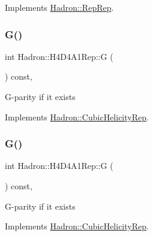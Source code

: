 Implements \mbox{\hyperlink{structHadron_1_1RepRep_a92c8802e5ed7afd7da43ccfd5b7cd92b}{Hadron\+::\+Rep\+Rep}}.

\mbox{\label{structHadron_1_1H4D4A1Rep_adfb4cdaba264ee24b4ab253ef4ca631c}} 
\subsubsection{\texorpdfstring{G()}{G()}\hspace{0.1cm}{\footnotesize\ttfamily [1/3]}}
{\footnotesize\ttfamily int Hadron\+::\+H4\+D4\+A1\+Rep\+::G (\begin{DoxyParamCaption}{ }\end{DoxyParamCaption}) const\hspace{0.3cm}{\ttfamily [inline]}, {\ttfamily [virtual]}}

G-\/parity if it exists 

Implements \mbox{\hyperlink{structHadron_1_1CubicHelicityRep_a50689f42be1e6170aa8cf6ad0597018b}{Hadron\+::\+Cubic\+Helicity\+Rep}}.

\mbox{\label{structHadron_1_1H4D4A1Rep_adfb4cdaba264ee24b4ab253ef4ca631c}} 
\subsubsection{\texorpdfstring{G()}{G()}\hspace{0.1cm}{\footnotesize\ttfamily [2/3]}}
{\footnotesize\ttfamily int Hadron\+::\+H4\+D4\+A1\+Rep\+::G (\begin{DoxyParamCaption}{ }\end{DoxyParamCaption}) const\hspace{0.3cm}{\ttfamily [inline]}, {\ttfamily [virtual]}}

G-\/parity if it exists 

Implements \mbox{\hyperlink{structHadron_1_1CubicHelicityRep_a50689f42be1e6170aa8cf6ad0597018b}{Hadron\+::\+Cubic\+Helicity\+Rep}}.

\mbox{\label{structHadron_1_1H4D4A1Rep_adfb4cdaba264ee24b4ab253ef4ca631c}} 
